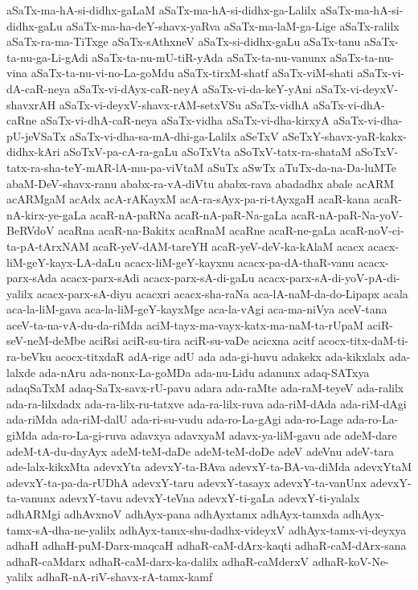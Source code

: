 {aSaTx-ma-hA-si-didhx-gaLaM
aSaTx-ma-hA-si-didhx-ga-Lalilx
aSaTx-ma-hA-si-didhx-gaLu
aSaTx-ma-ha-deY-shavx-yaRva
aSaTx-ma-laM-ga-Lige
aSaTx-ralilx
aSaTx-ra-ma-TiTxge
aSaTx-sAthxneV
aSaTx-si-didhx-gaLu
aSaTx-tanu
aSaTx-ta-nu-ga-Li-gAdi
aSaTx-ta-nu-mU-tiR-yAda
aSaTx-ta-nu-vanunx
aSaTx-ta-nu-vina
aSaTx-ta-nu-vi-no-La-goMdu
aSaTx-tirxM-shatf
aSaTx-viM-shati
aSaTx-vi-dA-caR-neya
aSaTx-vi-dAyx-caR-neyA
aSaTx-vi-da-keY-yAni
aSaTx-vi-deyxV-shavxrAH
aSaTx-vi-deyxV-shavx-rAM-setxVSu
aSaTx-vidhA
aSaTx-vi-dhA-caRne
aSaTx-vi-dhA-caR-neya
aSaTx-vidha
aSaTx-vi-dha-kirxyA
aSaTx-vi-dha-pU-jeVSaTx
aSaTx-vi-dha-sa-mA-dhi-ga-Lalilx
aSeTxV
aSeTxY-shavx-yaR-kakx-didhx-kAri
aSoTxV-pa-cA-ra-gaLu
aSoTxVta
aSoTxV-tatx-ra-shataM
aSoTxV-tatx-ra-sha-teY-mAR-lA-mu-pa-viVtaM
aSuTx
aSwTx
aTuTx-da-na-Da-luMTe
abaM-DeV-shavx-ranu
ababx-ra-vA-diVtu
ababx-rava
abadadhx
abale
acARM
acARMgaM
acAdx
acA-rAKayxM
acA-ra-sAyx-pa-ri-tAyxgaH
acaR-kana
acaR-nA-kirx-ye-gaLa
acaR-nA-paRNa
acaR-nA-paR-Na-gaLa
acaR-nA-paR-Na-yoV-BeRVdoV
acaRna
acaR-na-Bakitx
acaRnaM
acaRne
acaR-ne-gaLa
acaR-noV-ci-ta-pA-tArxNAM
acaR-yeV-dAM-tareYH
acaR-yeV-deV-ka-kAlaM
acacx
acacx-liM-geY-kayx-LA-daLu
acacx-liM-geY-kayxnu
acacx-pa-dA-thaR-vanu
acacx-parx-sAda
acacx-parx-sAdi
acacx-parx-sA-di-gaLu
acacx-parx-sA-di-yoV-pA-di-yalilx
acacx-parx-sA-diyu
acacxri
acacx-sha-raNa
aca-lA-naM-da-do-Lipapx
acala
aca-la-liM-gava
aca-la-liM-geY-kayxMge
aca-la-vAgi
aca-ma-niVya
aceV-tana
aceV-ta-na-vA-du-da-riMda
aciM-tayx-ma-vayx-katx-ma-naM-ta-rUpaM
aciR-seV-neM-deMbe
aciRsi
aciR-su-tira
aciR-su-vaDe
acicxna
acitf
acocx-titx-daM-ti-ra-beVku
acocx-titxdaR
adA-rige
adU
ada
ada-gi-huvu
adakekx
ada-kikxlalx
ada-lalxde
ada-nAru
ada-nonx-La-goMDa
ada-nu-Lidu
adanunx
adaq-SATxya
adaqSaTxM
adaq-SaTx-savx-rU-pavu
adara
ada-raMte
ada-raM-teyeV
ada-ralilx
ada-ra-lilxdadx
ada-ra-lilx-ru-tatxve
ada-ra-lilx-ruva
ada-riM-dAda
ada-riM-dAgi
ada-riMda
ada-riM-dalU
ada-ri-su-vudu
ada-ro-La-gAgi
ada-ro-Lage
ada-ro-La-giMda
ada-ro-La-gi-ruva
adavxya
adavxyaM
adavx-ya-liM-gavu
ade
adeM-dare
adeM-tA-du-dayAyx
adeM-teM-daDe
adeM-teM-doDe
adeV
adeVnu
adeV-tara
ade-lalx-kikxMta
adevxYta
adevxY-ta-BAva
adevxY-ta-BA-va-diMda
adevxYtaM
adevxY-ta-pa-da-rUDhA
adevxY-taru
adevxY-tasayx
adevxY-ta-vanUnx
adevxY-ta-vanunx
adevxY-tavu
adevxY-teVna
adevxY-ti-gaLa
adevxY-ti-yalalx
adhARMgi
adhAvxnoV
adhAyx-pana
adhAyxtamx
adhAyx-tamxda
adhAyx-tamx-sA-dha-ne-yalilx
adhAyx-tamx-shu-dadhx-videyxV
adhAyx-tamx-vi-deyxya
adhaH
adhaH-puM-Darx-maqcaH
adhaR-caM-dArx-kaqti
adhaR-caM-dArx-sana
adhaR-caMdarx
adhaR-caM-darx-ka-dalilx
adhaR-caMderxV
adhaR-koV-Ne-yalilx
adhaR-nA-riV-shavx-rA-tamx-kamf
}
